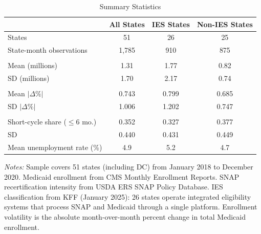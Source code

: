 \begin{table}[t]
\centering
\caption{Summary Statistics}
\label{tab:summary}
\begin{tabular}{lccc}
\hline\hline
 & All States & IES States & Non-IES States \\
\hline
States & 51 & 26 & 25 \\
State-month observations & 1,785 & 910 & 875 \\
\addlinespace
\multicolumn{4}{l}{\textit{Medicaid Enrollment}} \\
\quad Mean (millions) & 1.31 & 1.77 & 0.82 \\
\quad SD (millions) & 1.70 & 2.17 & 0.74 \\
\addlinespace
\multicolumn{4}{l}{\textit{Enrollment Volatility (\% month-over-month)}} \\
\quad Mean $|\Delta\%|$ & 0.743 & 0.799 & 0.685 \\
\quad SD $|\Delta\%|$ & 1.006 & 1.202 & 0.747 \\
\addlinespace
\multicolumn{4}{l}{\textit{SNAP Recertification Intensity}} \\
\quad Short-cycle share ($\leq$6 mo.) & 0.352 & 0.327 & 0.377 \\
\quad SD & 0.440 & 0.431 & 0.449 \\
\addlinespace
Mean unemployment rate (\%) & 4.9 & 5.2 & 4.7 \\
\hline\hline
\end{tabular}
\begin{tablenotes}
\item \textit{Notes:} Sample covers 51 states (including DC) from January 2018 to December 2020. Medicaid enrollment from CMS Monthly Enrollment Reports. SNAP recertification intensity from USDA ERS SNAP Policy Database. IES classification from KFF (January 2025): 26 states operate integrated eligibility systems that process SNAP and Medicaid through a single platform. Enrollment volatility is the absolute month-over-month percent change in total Medicaid enrollment.
\end{tablenotes}
\end{table}

